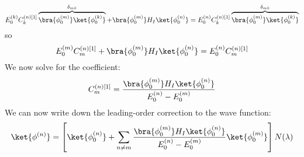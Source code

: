 \documentclass[a4paper,twoside,master.tex]{subfiles}
\begin{document}
\begin{equation}
    E_0^{(k)} C_k^{(n)[1]}\overbrace{\bra{\phi_0^{(m)}}\ket{\phi_0^{(k)}}}^{\delta_{mk}} +\bra{\phi_0^{(m)}} H_I\ket{\phi_0^{(n)}} = E_0^{(n)} C^{(n)[1]}_k\overbrace{\bra{\phi_0^{(m)}}\ket{\phi_0^{(k)}}}^{\delta_{mk}}
\end{equation}
so
\begin{equation}
    E_0^{(m)} C^{(n)[1]}_m +\bra{\phi_0^{(m)}} H_I\ket{\phi_0^{(n)}} = E_0^{(n)} C_m^{(n)[1]}
\end{equation}
We now solve for the coefficient:
\begin{equation}
    C_m^{(n)[1]} = \frac{\bra{\phi_0^{(m)}} H_I\ket{\phi_0^{(n)}}}{E_0^{(n)} - E_0^{(m)}}
\end{equation}
We can now write down the leading-order correction to the wave function:
\begin{equation}
    \ket{\phi^{(n)}} = \left[\ket{\phi_0^{(n)}} + \sum_{n \neq m} \frac{\bra{\phi_0^{(m)}} H_I\ket{\phi_0^{(n)}}}{E_0^{(n)} - E_0^{(m)}}\ket{\phi_0^{(m)}}\right] N(\lambda) 
\end{equation}
\end{document}
